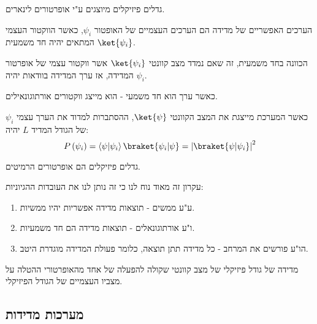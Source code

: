 \documentclass{tstextbook}
\begin{document}
\begin{proposition}
גדלים פיזיקלים מיוצגים ע"י אופרטורים לינארים.

\end{proposition}
\begin{proposition}
הערכים האפשריים של מדידה הם הערכים העצמיים של האופטור \(\psi_{i}\), כאשר הווקטור העצמי המתאים יהיה חד משמעית \(\ket{\psi_{i}}\).

\end{proposition}
\begin{remark}
הכוונה בחד משמעית, זה שאם נמדד מצב קוונטי \(\ket{\psi_{i}}\) אשר ווקטור עצמי של אופרטור המדידה, אז ערך המדידה בוודאות יהיה \(\psi_{i}\). 

\end{remark}
\begin{proposition}
כאשר ערך הוא חד משמעי - הוא מייצג ווקטורים אורתוגונאילים.

\end{proposition}
\begin{proposition}
כאשר המערכת מייצגת את המצב הקוונטי \(\ket{\psi}\), ההסתברות למדוד את הערך עצמי \(\psi_{i}\) של הגודל המדיד \(L\) יהיה:
$$P\left( \psi_{i} \right)=\left\langle  \psi | \psi_{i}  \right\rangle \braket{ \psi_{i} | \psi }= \left\lvert  \braket{ \psi | \psi_{i} }  \right\rvert ^2 $$

\end{proposition}
\begin{theorem}
גדלים פיזיקלים הם אופרטורים הרמיטים.

\end{theorem}
עקרון זה מאוד נוח לנו כי זה נותן לנו את העובדות ההגיוניות:

\begin{enumerate}
  \item ע"ע ממשים - תוצאות מדידה אפשריות יהיו ממשיות. 


  \item ו"ע אורתוגונאלים - תוצאות מדידה הם חד משמעיות. 


  \item הו"ע פורשים את המרחב - כל מדידה תתן תוצאה, כלומר פעולת המדידה מוגדרת היטב. 


\end{enumerate}
\begin{theorem}
מדידה של גודל פיזיקלי של מצב קוונטי שקולה להפעלה של אחד מהאופרטורי ההטלה על מצביו העצמיים של הגודל הפיזיקלי.

\end{theorem}
\subsection{מערכות מדידות}
\end{document}
